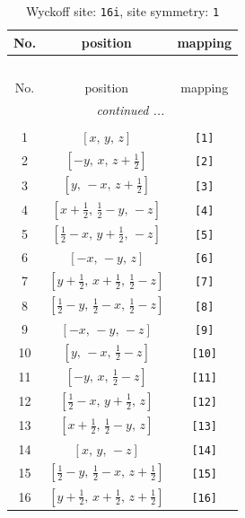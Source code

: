 \documentclass[fleqn,8pt]{jsarticle}
\begin{document}
\begin{longtable}{ccc}
\caption{Wyckoff site: {\tt 16i}, site symmetry: {\tt 1}}
 \\
 \hline \hline
No. & position & mapping \\ \hline \endfirsthead

\multicolumn{2}{l}{\tablename\ \thetable{}} \\
 \hline \hline
No. & position & mapping \\ \hline \endhead

 \hline \hline
\multicolumn{2}{r}{\footnotesize\it continued ...} \\ \endfoot

 \hline \hline
\multicolumn{2}{r}{} \\ \endlastfoot

1 & $\left[ x,\, y,\, z \right]$ & {\tt [1]} \\ \hline
2 & $\left[ - y,\, x,\, z + \frac{1}{2} \right]$ & {\tt [2]} \\ \hline
3 & $\left[ y,\, - x,\, z + \frac{1}{2} \right]$ & {\tt [3]} \\ \hline
4 & $\left[ x + \frac{1}{2},\, \frac{1}{2} - y,\, - z \right]$ & {\tt [4]} \\ \hline
5 & $\left[ \frac{1}{2} - x,\, y + \frac{1}{2},\, - z \right]$ & {\tt [5]} \\ \hline
6 & $\left[ - x,\, - y,\, z \right]$ & {\tt [6]} \\ \hline
7 & $\left[ y + \frac{1}{2},\, x + \frac{1}{2},\, \frac{1}{2} - z \right]$ & {\tt [7]} \\ \hline
8 & $\left[ \frac{1}{2} - y,\, \frac{1}{2} - x,\, \frac{1}{2} - z \right]$ & {\tt [8]} \\ \hline
9 & $\left[ - x,\, - y,\, - z \right]$ & {\tt [9]} \\ \hline
10 & $\left[ y,\, - x,\, \frac{1}{2} - z \right]$ & {\tt [10]} \\ \hline
11 & $\left[ - y,\, x,\, \frac{1}{2} - z \right]$ & {\tt [11]} \\ \hline
12 & $\left[ \frac{1}{2} - x,\, y + \frac{1}{2},\, z \right]$ & {\tt [12]} \\ \hline
13 & $\left[ x + \frac{1}{2},\, \frac{1}{2} - y,\, z \right]$ & {\tt [13]} \\ \hline
14 & $\left[ x,\, y,\, - z \right]$ & {\tt [14]} \\ \hline
15 & $\left[ \frac{1}{2} - y,\, \frac{1}{2} - x,\, z + \frac{1}{2} \right]$ & {\tt [15]} \\ \hline
16 & $\left[ y + \frac{1}{2},\, x + \frac{1}{2},\, z + \frac{1}{2} \right]$ & {\tt [16]} \\
\end{longtable}
\end{document}
